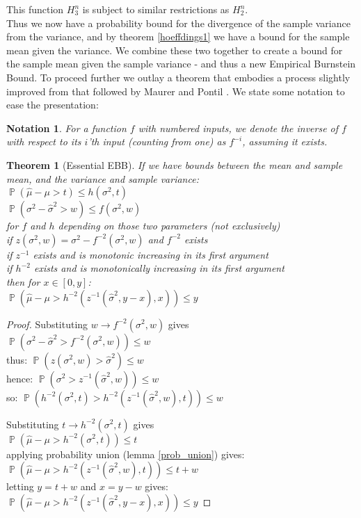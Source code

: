 \documentclass[aap,preprint]{imsart}
\newtheorem{notation}{Notation}
\newtheorem{theorem}{Theorem}
\DeclareMathOperator{\p}{\mathbb{P}}
\begin{document}
This function $H_3^n$ is subject to similar restrictions as $H_2^n$.\\
Thus we now have a probability bound for the divergence of the sample variance from the variance, and by theorem \ref{hoeffdings1} we have a bound for the sample mean given the variance. We combine these two together to create a bound for the sample mean given the sample variance - and thus a new Empirical Burnstein Bound.
To proceed further we outlay a theorem that embodies a process slightly improved from that followed by Maurer and Pontil \cite{Maurer50empiricalbernstein}. We state some notation to ease the presentation:

\begin{notation}
For a function $f$ with numbered inputs, we denote the inverse of $f$ with respect to its $i$'th input (counting from one) as $f^{-i}$, assuming it exists.
\end{notation}

\begin{theorem}[Essential EBB]\label{ebb1} If we have bounds between the mean and sample mean, and the variance and sample variance:
\\ $\p(\hat{\mu}-\mu>t)\le h(\sigma^2,t)$\\
$\p(\sigma^2-\hat{\sigma}^2>w)\le f(\sigma^2,w)$ \\ 
for $f$ and $h$ depending on those two parameters (not exclusively)\\
if $z(\sigma^2,w) = \sigma^2-f^{-2}(\sigma^2,w)$ and $f^{-2}$ exists\\
if $z^{-1}$ exists and is monotonic increasing in its first argument\\
if $h^{-2}$ exists and is monotonically increasing in its first argument\\then for $x\in[0,y]$:\\
$\p(\hat{\mu}-\mu>h^{-2}(z^{-1}(\hat{\sigma}^2,y-x),x))\le y$
\end{theorem}
\begin{proof}
Substituting $w\rightarrow f^{-2}(\sigma^2,w)$ gives\\ 
$\p(\sigma^2-\hat{\sigma}^2>f^{-2}(\sigma^2,w))\le w$\\
thus:
$\p(z(\sigma^2,w)>\hat{\sigma}^2)\le w$\\
hence:
$\p(\sigma^2>z^{-1}(\hat{\sigma}^2,w))\le w$\\
so:
$\p(h^{-2}(\sigma^2,t)>h^{-2}(z^{-1}(\hat{\sigma}^2,w),t))\le w$

Substituting $t\rightarrow h^{-2}(\sigma^2,t)$ gives\\ $\p(\hat{\mu}-\mu>h^{-2}(\sigma^2,t))\le t$\\
applying probability union (lemma \ref{prob_union}) gives:\\
$\p(\hat{\mu}-\mu>h^{-2}(z^{-1}(\hat{\sigma}^2,w),t))\le t+w$\\
letting $y=t+w$ and $x=y-w$ gives:\\
$\p(\hat{\mu}-\mu>h^{-2}(z^{-1}(\hat{\sigma}^2,y-x),x))\le y$
\end{proof}
\end{document}
